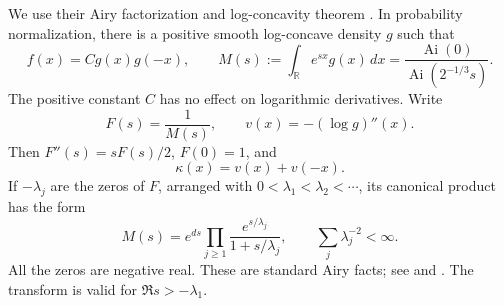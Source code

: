 \documentclass[11pt,a4paper]{article}
\numberwithin{equation}{section}
\theoremstyle{definition}
\theoremstyle{remark}
\begin{document}
We use their Airy factorization and log-concavity theorem
\cite[(1.3)--(2.5), Proposition 2.2]{add49heisei:bw}. In probability normalization,
there is a positive smooth log-concave density $g$ such that
\begin{equation}\label{add49heisei:eq:normalization}
 f(x)=C g(x)g(-x),\qquad
 M(s):=\int_{\mathbb R}e^{sx}g(x)\,dx
 =\frac{\operatorname{Ai}(0)}{\operatorname{Ai}(2^{-1/3}s)}.
\end{equation}
The positive constant $C$ has no effect on logarithmic derivatives.
Write
\[
 F(s)=\frac1{M(s)},\qquad v(x)=-(\log g)''(x).
\]
Then $F''(s)=sF(s)/2$, $F(0)=1$, and
\begin{equation}\label{add49heisei:eq:curvature}
 \kappa(x)=v(x)+v(-x).
\end{equation}
If $-\lambda_j$ are the zeros of $F$, arranged with
$0<\lambda_1<\lambda_2<\cdots$, its canonical product has the form
\begin{equation}\label{add49heisei:eq:product}
 M(s)=e^{ds}\prod_{j\ge1}\frac{e^{s/\lambda_j}}{1+s/\lambda_j},
 \qquad \sum_j\lambda_j^{-2}<\infty.
\end{equation}
All the zeros are negative real. These are standard Airy facts; see
\cite[Proposition 2.1]{add49heisei:bw} and \cite[\S\S9.2, 9.9]{add49heisei:dlmf}.
The transform is valid for $\Re s>-\lambda_1$.
\end{document}
